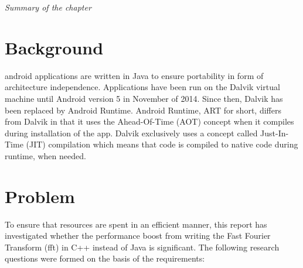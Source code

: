 
\textit{Summary of the chapter}


\section{Background}
\gls{android} applications are written in Java to ensure portability in form of architecture independence. Applications have been run on the Dalvik virtual machine until Android version 5\cite{android:dalvik} in November of 2014\cite{android:dalvik:release}. Since then, Dalvik has been replaced by Android Runtime. Android Runtime, ART for short, differs from Dalvik in that it uses the Ahead-Of-Time (AOT) concept when it compiles during installation of the app. Dalvik exclusively uses a concept called Just-In-Time (JIT) compilation which means that code is compiled to native code during runtime, when needed.




\section{Problem}
To ensure that resources are spent in an efficient manner, this report has investigated whether the performance boost from writing the Fast Fourier Transform (\gls{fft}) in C++ instead of Java is significant. The following research questions were formed on the basis of the requirements:


